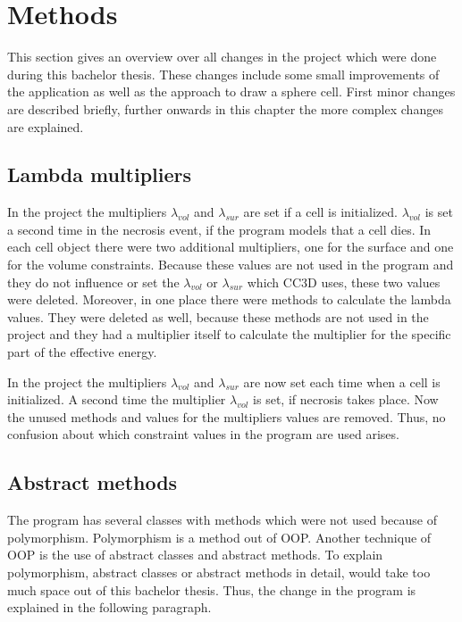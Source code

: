 \chapter{Methods}

    
    
This section gives an overview over all changes in the project which were done during this bachelor thesis. These changes include some small improvements of the application as well as the approach to draw a sphere cell. First minor changes are described briefly, further onwards in this chapter the more complex changes are explained. 

\section{Lambda multipliers} \label{sec:LambdaMultipliers}
In the project the multipliers $\lambda_{vol}$ and $\lambda_{sur}$ are set if a cell is initialized. $\lambda_{vol}$ is set a second time in the necrosis event, if the program models that a cell dies. \newline
In each cell object there were two additional multipliers, one for the surface and one for the volume constraints. Because these values are not used in the program and they do not influence or set the $\lambda_{vol}$ or $\lambda_{sur}$ which \ac{CC3D} uses, these two values were deleted. Moreover, in one place there were methods to calculate the lambda values. They were deleted as well, because these methods are not used in the project and they had a multiplier itself to calculate the multiplier for the specific part of the effective energy. 

In the project the multipliers $\lambda_{vol}$ and $\lambda_{sur}$ are now set each time when a cell is initialized. A second time the multiplier $\lambda_{vol}$ is set, if necrosis takes place. Now the unused methods and values for the multipliers values are removed. Thus, no confusion about which constraint values in the program are used arises.


\section{Abstract methods}\label{sec:AbstractMethods}
The program has several classes with methods which were not used because of polymorphism. Polymorphism is a method out of \ac{OOP}. Another technique of \ac{OOP} is the use of abstract classes and abstract methods. To explain polymorphism, abstract classes or abstract methods in detail, would take too much space out of this bachelor thesis. Thus, the change in the program is explained in the following paragraph.

